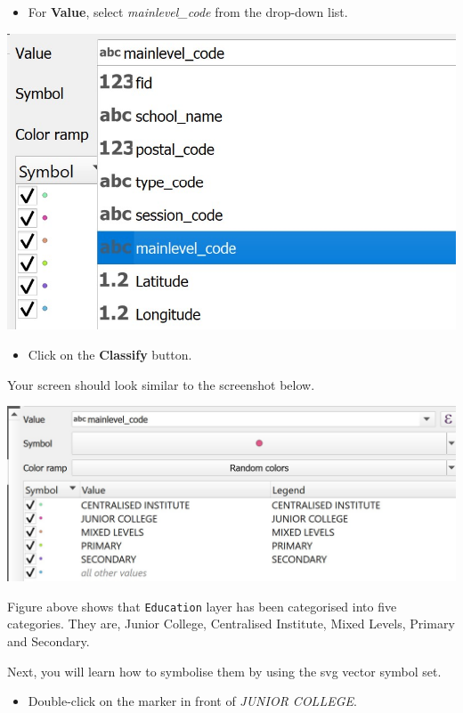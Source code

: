 \documentclass[
  letterpaper,
  DIV=11,
  numbers=noendperiod]{scrreprt}
\providecommand{\tightlist}{%
  \setlength{\itemsep}{0pt}\setlength{\parskip}{0pt}}\usepackage{longtable,booktabs,array}
\begin{document}
\begin{itemize}
\tightlist
\item
  For \textbf{Value}, select \emph{mainlevel\_code} from the drop-down
  list.
\end{itemize}

\includegraphics{./img03/image4.jpg}

\begin{itemize}
\tightlist
\item
  Click on the \textbf{Classify} button.
\end{itemize}

Your screen should look similar to the screenshot below.

\includegraphics{./img03/image5.jpg}

Figure above shows that \texttt{Education} layer has been categorised
into five categories. They are, Junior College, Centralised Institute,
Mixed Levels, Primary and Secondary.

Next, you will learn how to symbolise them by using the svg vector
symbol set.

\begin{itemize}
\tightlist
\item
  Double-click on the marker in front of \emph{JUNIOR COLLEGE}.
\end{itemize}
\end{document}
